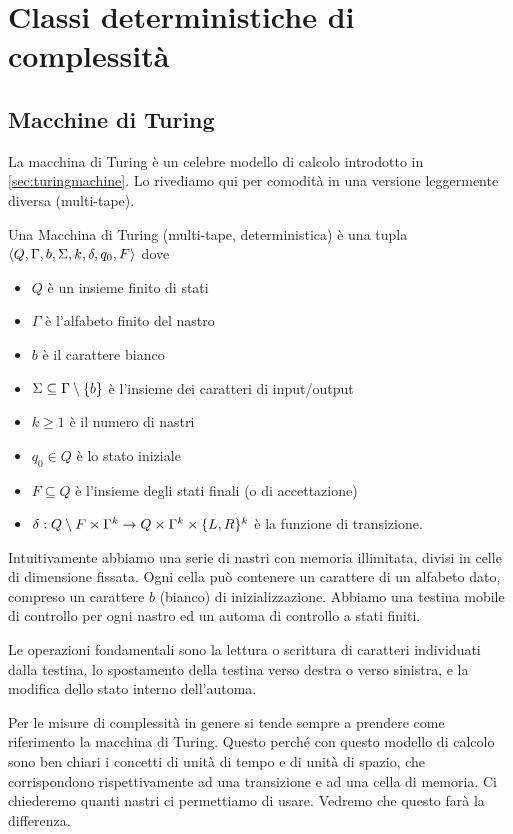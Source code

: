 \chapter{Classi deterministiche di complessità}

\section{Macchine di Turing}

La macchina di Turing è un celebre modello di calcolo introdotto in \ref{sec:turingmachine}. Lo
rivediamo qui per comodità in una versione leggermente diversa (multi-tape).

\begin{defn}
    Una Macchina di Turing (multi-tape, deterministica) è una tupla $\langle Q, \Gamma, b, \Sigma,
    k, \delta, q_{0}, F \rangle$ dove
    \begin{itemize}
        \item $Q$ è un insieme finito di stati
        \item $\Gamma$ è l'alfabeto finito del nastro
        \item $b$ è il carattere bianco
        \item $\Sigma \subseteq \Gamma \setminus \{b\}$ è l'insieme dei caratteri di input/output
        \item $k \geq 1$ è il numero di nastri
        \item $q_{0} \in Q$ è lo stato iniziale
        \item $F \subseteq Q$ è l'insieme degli stati finali (o di accettazione)
        \item $\delta: Q \setminus F \times \Gamma^{k} \to Q \times \Gamma^{k} \times
        \{L,R\}^{k}$ è la funzione di transizione.
    \end{itemize}
\end{defn}

Intuitivamente abbiamo una serie di nastri con memoria illimitata, divisi in celle di dimensione
fissata. Ogni cella può contenere un carattere di un alfabeto dato, compreso un carattere $b$
(bianco) di inizializzazione. Abbiamo una testina mobile di controllo per ogni nastro ed un automa
di controllo a stati finiti.

Le operazioni fondamentali sono la lettura o scrittura di caratteri individuati dalla testina, lo
spostamento della testina verso destra o verso sinistra, e la modifica dello stato interno
dell'automa.

Per le misure di complessità in genere si tende sempre a prendere come riferimento la macchina di
Turing. Questo perché con questo modello di calcolo sono ben chiari i concetti di unità di tempo e
di unità di spazio, che corrispondono rispettivamente ad una transizione e ad una cella di memoria.
Ci chiederemo quanti nastri ci permettiamo di usare. Vedremo che questo farà la differenza.

